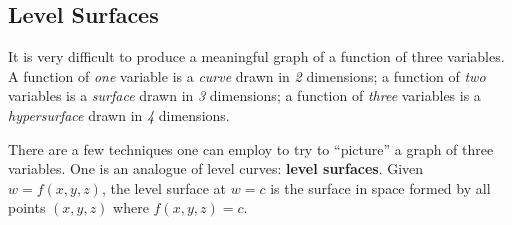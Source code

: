 \subsection{Level Surfaces}

It is very difficult to produce a meaningful graph of a function of three variables. A function of \emph{one} variable is a \emph{curve} drawn in \emph{2} dimensions; a function of \emph{two} variables is a \emph{surface} drawn in \emph{3} dimensions; a function of \emph{three} variables is a \emph{hypersurface} drawn in \emph{4} dimensions.

There are a few techniques one can employ to try to ``picture'' a graph of three variables. One is an analogue of level curves: \textbf{level surfaces}. Given $w=f(x,y,z)$, the level surface at $w=c$ is the surface in space formed by all points $(x,y,z)$ where $f(x,y,z)=c$.

